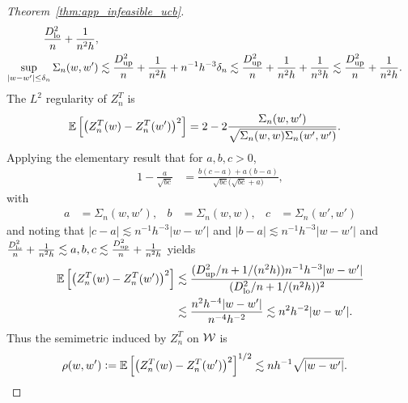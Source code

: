 \begin{proof}[Theorem~\ref{thm:app_infeasible_ucb}]
\begin{align*}
    \frac{D_{\textup{lo}}^2}{n}
    + \frac{1}{n^2h}, \\
    \sup_{|w-w'| \leq \delta_n}
    \Sigma_n(w,w')
    &\lesssim
    \frac{D_{\textup{up}}^2}{n}
    + \frac{1}{n^2h}
    + n^{-1} h^{-3} \delta_n
    \lesssim
    \frac{D_{\textup{up}}^2}{n}
    + \frac{1}{n^2h}
    + \frac{1}{n^3h}
    \lesssim
    \frac{D_{\textup{up}}^2}{n}
    + \frac{1}{n^2h}.
  \end{align*}
  The $L^2$
  regularity of $Z_n^T$
  is
  \begin{align*}
    \mathbb{E}\left[
      \big(
        Z_n^T(w) - Z_n^T(w')
      \big)^2
    \right]
    &=
    2 - 2
    \frac{\Sigma_n(w,w')}
    {\sqrt{\Sigma_n(w,w) \Sigma_n(w',w')}}.
  \end{align*}
  Applying the elementary result
  that for $a,b,c > 0$,
  \begin{align*}
    1 - \frac{a}{\sqrt{b c}}
    &=
    \frac{b(c-a) + a(b-a)}
    {\sqrt{b c}\big(\sqrt{b c} + a\big)},
  \end{align*}
  with
  \begin{align*}
    a&= \Sigma_n(w,w'),
    &b                &= \Sigma_n(w,w),
    &c                &= \Sigma_n(w',w')
  \end{align*}
  and noting that
  $|c-a| \lesssim n^{-1} h^{-3} |w-w'|$
  and
  $|b-a| \lesssim n^{-1} h^{-3} |w-w'|$
  and
  $\frac{D_{\textup{lo}}^2}{n} + \frac{1}{n^2h}
  \lesssim a,b,c
  \lesssim \frac{D_{\textup{up}}^2}{n} + \frac{1}{n^2h}$
  yields
  \begin{align*}
    \mathbb{E}\left[
      \big(
        Z_n^T(w) - Z_n^T(w')
      \big)^2
    \right]
    &\lesssim
    \frac{(D_{\textup{up}}^2/n + 1/(n^2h))n^{-1}h^{-3}|w-w'|}
    {(D_{\textup{lo}}^2/n + 1/(n^2h))^2} \\
    &\lesssim
    \frac{n^{2} h^{-4}|w-w'|}
    {n^{-4}h^{-2}}
    \lesssim
    n^2 h^{-2} |w-w'|.
  \end{align*}
  Thus the semimetric
  induced by $Z_n^T$ on $\mathcal{W}$ is
  \begin{align*}
    \rho(w,w')
    &\vcentcolon=
    \mathbb{E}\left[
      \big(
        Z_n^T(w) - Z_n^T(w')
      \big)^2
    \right]^{1/2}
    \lesssim
    n h^{-1} \sqrt{|w-w'|}.
  \end{align*}



\end{proof}

